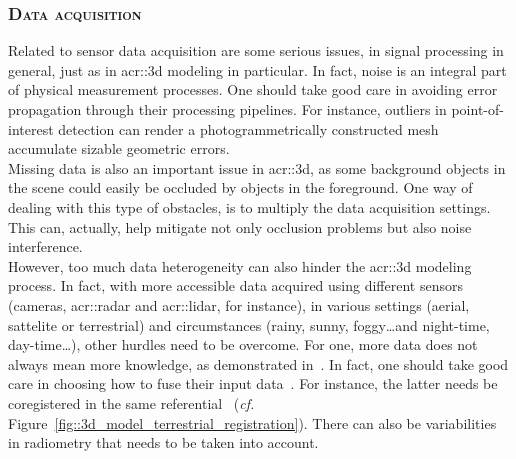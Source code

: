         \subsubsection{\textsc{Data acquisition}}
            Related to sensor data acquisition are some serious issues, in signal processing in general, just as in \gls{acr::3d} modeling in particular.
            In fact, noise is an integral part of physical measurement processes.
            One should take good care in avoiding error propagation through their processing pipelines.
            For instance, outliers in point-of-interest detection can render a photogrammetrically constructed mesh accumulate sizable geometric errors.\\
            Missing data is also an important issue in \gls{acr::3d}, as some background objects in the scene could easily be occluded by objects in the foreground.
            One way of dealing with this type of obstacles, is to multiply the data acquisition settings.
            This can, actually, help mitigate not only occlusion problems but also noise interference.\\
            However, too much data heterogeneity can also hinder the \gls{acr::3d} modeling process.
            In fact, with more accessible data acquired using different sensors (cameras, \gls{acr::radar} and \gls{acr::lidar}, for instance), in various settings (aerial, sattelite or terrestrial) and circumstances (rainy, sunny, foggy\dots and night-time, day-time\dots), other hurdles need to be overcome.
            For one, more data does not always mean more knowledge, as demonstrated in~\textcite{brachmann2018learning}.
            In fact, one should take good care in choosing how to fuse their input data~\parencite{kedzierski2014terrestrial}.
            For instance, the latter needs be coregistered in the same referential~\parencite{monnier2013registration, mezian2016uncertainty} (\textit{cf.} Figure~\ref{fig::3d_model_terrestrial_registration}).
            There can also be variabilities in radiometry that needs to be taken into account.\addref
